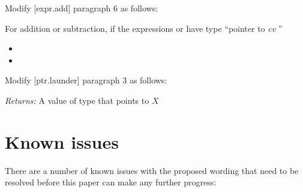 Modify [expr.add] paragraph 6 as follows:

\begin{adjustwidth}{0.5cm}{0.5cm}
For addition or subtraction, if the expressions  or  have type ``pointer to \emph{cv} ''
\begin{itemize}
  \item {}
  \item {}
\end{itemize}
\end{adjustwidth}


Modify [ptr.launder] paragraph 3 as follows:

\begin{adjustwidth}{0.5cm}{0.5cm}
\emph{Returns: } A value of type  that points to  $X$ 
\end{adjustwidth}


\pagebreak
\section{Known issues}
\label{sec:issues}

There are a number of known issues with the proposed wording that need to be resolved before this paper can make any further progress:

